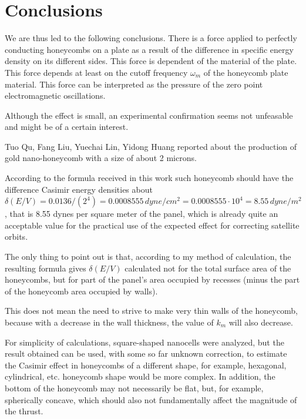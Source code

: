 \documentclass[11pt]{article}
\begin{document}
    \section{Conclusions}\label{conclusions}

    We are thus led to the following conclusions. There is a force applied
to perfectly conducting honeycombs on a plate as a result of the
difference in specific energy density on its different sides. This force
is dependent of the material of the plate. This force depends at least
on the cutoff frequency \(\omega_m\) of the honeycomb plate material.
This force can be interpreted as the pressure of the zero point
electromagnetic oscillations.

    Although the effect is small, an experimental confirmation seems not
unfeasable and might be of a certain interest.

    Tuo Qu, Fang Liu, Yuechai Lin, Yidong Huang \cite{Tuo2019} reported
about the production of gold nano-honeycomb with a size of about 2
microns.

    According to the formula received in this work such honeycomb should
have the difference Casimir energy densities about
\(\delta\left(E/V\right) = 0.0136/({2^4}) = 0.0008555\,dyne/cm^2 = 0.0008555 \cdot 10^4 = 8.55\,dyne/m^2\),
that is 8.55 dynes per square meter of the panel, which is already quite
an acceptable value for the practical use of the expected effect for
correcting satellite orbits.

    The only thing to point out is that, according to my method of
calculation, the resulting formula gives \(\delta\left(E/V\right)\)
calculated not for the total surface area of the honeycombs, but for
part of the panel's area occupied by recesses (minus the part of the
honeycomb area occupied by walls).

    This does not mean the need to strive to make very thin walls of the
honeycomb, because with a decrease in the wall thickness, the value of
\(k_m\) will also decrease.

    For simplicity of calculations, square-shaped nanocells were analyzed,
but the result obtained can be used, with some so far unknown correction,
to estimate the Casimir effect in honeycombs of a different shape,
for example, hexagonal, cylindrical, etc. honeycomb shape would be more complex.
In addition, the bottom of the honeycomb may not necessarily be flat, but,
for example, spherically concave, which should also not fundamentally affect
the magnitude of the thrust.
\end{document}
